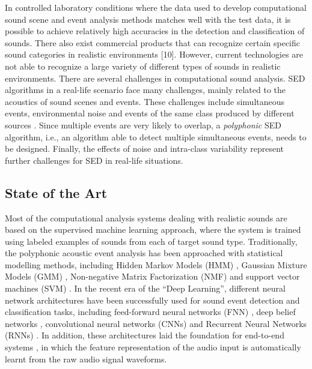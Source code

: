 In controlled laboratory conditions where the data used to develop computational
sound scene and event analysis methods matches well with the test data, it is possible
to achieve relatively high accuracies in the detection and classification of sounds. There also exist commercial products that can recognize certain specific sound
categories in realistic environments [10]. However, current technologies are not able
to recognize a large variety of different types of sounds in realistic environments.
There are several challenges in computational sound analysis.
SED algorithms in a real-life scenario face many challenges, mainly related to the acoustics of sound scenes and events.
These challenges include simultaneous events, environmental noise and events of the same class produced by different sources \cite{stowell2015acoustic}. Since multiple events are very likely to overlap, a \textit{polyphonic} SED algorithm, i.e., an algorithm able to detect multiple simultaneous events, needs to be designed.
Finally, the effects of noise and intra-class variability represent further challenges for SED in real-life situations. 

\subsection{State of the Art}
Most of the computational analysis systems dealing with realistic sounds are
based on the supervised machine learning approach, where the system is trained
using labeled examples of sounds from each of target sound type.
Traditionally, the polyphonic acoustic event analysis has been approached with statistical modelling methods, including Hidden Markov Models (HMM) \cite{degara2011onset}, Gaussian Mixture Models (GMM) \cite{heittola2010audio}, Non-negative Matrix Factorization (NMF) \cite{carabias2011musical} and support vector machines (SVM) \cite{guo2003content}. In the recent era of the ``Deep Learning'', different neural network architectures have been successfully used for sound event detection and classification tasks, including feed-forward neural networks (FNN) \cite{mcloughlin2015robust}, deep belief networks \cite{mohamed2012acoustic}, convolutional neural networks (CNNs) \cite{piczak2015environmental} and Recurrent Neural Networks (RNNs) \cite{graves2013speech}. In addition, these architectures laid the foundation for end-to-end systems \cite{trigeorgis2016adieu, wu2017end}, in which the feature representation of the audio input is automatically learnt from the raw audio signal waveforms. 

